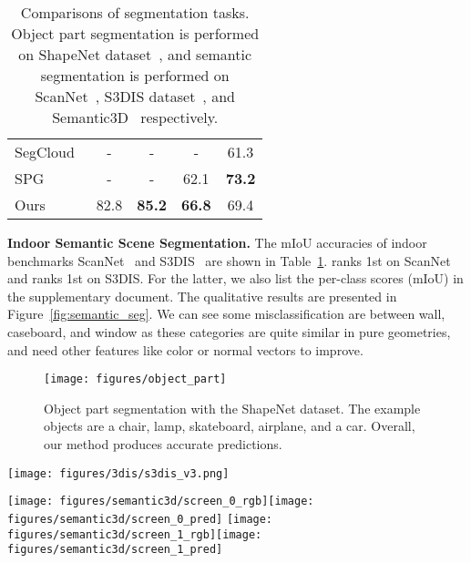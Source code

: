 \documentclass[10pt,twocolumn,letterpaper]{article}
\begin{document}
\begin{table}[t]
\begin{center}
\begin{tabular}{l c|c|c|c}
		SegCloud~\cite{tchapmi2017segcloud}    & -   & - & -  & 61.3\\
		SPG~\cite{landrieu-superpoint-cvpr18}  & -   & - & 62.1  & \textbf{73.2}\\
		\midrule
		Ours     &  82.8 &  \textbf{85.2}  & \textbf{66.8} & 69.4\\
		\bottomrule
	\end{tabular}
	\smallgap
	\caption{Comparisons of segmentation tasks. Object part segmentation is performed on ShapeNet dataset~\cite{chang2015shapenet}, and semantic segmentation is performed on ScanNet~\cite{dai2017scannet}, S3DIS dataset~\cite{armeni-parsing-cvpr16}, and Semantic3D~\cite{hackel2017isprs} respectively.}
	\label{tab:segmentation}
	\end{center}
\end{table}

\noindent \textbf{Indoor Semantic Scene Segmentation.} 
The mIoU accuracies of indoor benchmarks ScanNet~\cite{dai2017scannet} and S3DIS~\cite{armeni-parsing-cvpr16}  are shown in Table~\ref{tab:segmentation}. \ournet ranks 1st on ScanNet and ranks 1st on S3DIS. For the latter, we also list the per-class scores (mIoU) in the supplementary document. The qualitative results are presented in Figure~\ref{fig:semantic_seg}. We can see some misclassification are between wall, caseboard, and window as these categories are quite similar in pure geometries, and need other features like color or normal vectors to improve. 

\begin{figure}[t]
	\centering
	\texttt{[image: figures/object\_part]}
	\caption{Object part segmentation with the ShapeNet dataset. The example objects are a chair, lamp, skateboard, airplane, and a car. Overall, our method produces accurate predictions.}
	\label{fig:object_part}
\end{figure} 
\begin{figure*}[t]
	\centering
	\texttt{[image: figures/3dis/s3dis\_v3.png]}
	\caption{Semantic segmentation for indoor scenes in the S3DIS dataset~\cite{armeni-parsing-cvpr16}.}
	\label{fig:semantic_seg}
\end{figure*}
\begin{figure*}
	\centering
	\texttt{[image: figures/semantic3d/screen\_0\_rgb]}\hspace{.15cm}\texttt{[image: figures/semantic3d/screen\_0\_pred]}\vspace{.05cm}
	\texttt{[image: figures/semantic3d/screen\_1\_rgb]}\hspace{.15cm}\texttt{[image: figures/semantic3d/screen\_1\_pred]}\caption{Semantic segmentation for outdoor scenes in the Semantic3D dataset~\cite{hackel2017isprs}. Left: colored point clouds (for visualization only). Right: our segmentation. Note that the ground truth of the test set is not publicly available.}
	\label{fig:semantic3d_seg}
\end{figure*}
\end{document}
